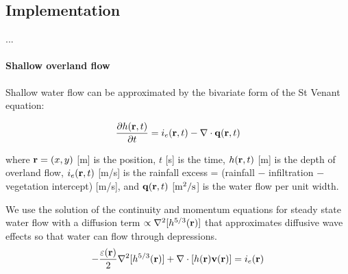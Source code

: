 \documentclass{isprs}
\begin{document}





\subsection{Implementation}
...

\paragraph{Shallow overland flow}





Shallow water flow can be approximated by
the bivariate form of the St Venant equation:

\begin{equation}
\label{eq:water}
{\partial h({\bf r},t) \over \partial t} =
 i_e({\bf r},t) - \nabla \cdot {\bf q}({\bf r},t)
\end{equation}

where 
${\bf r}=(x,y)$ [m] is the position, 
$t$ [s] is the time,
$h({\bf r},t)$ [m] is the depth of overland flow,
$i_e({\bf r},t)$ [m/s] is the rainfall excess = 
(rainfall $-$ infiltration $-$ vegetation intercept) [m/s], and
${\bf q}({\bf r},t)$ [$\rm m^2/s$] is the water flow per unit width.

We use the solution of the continuity and momentum equations for steady state water flow
with a diffusion term $ \propto \nabla^2 [h^{5/3}({\bf r})]$ 
that approximates diffusive wave effects 
so that water can flow through depressions. 
%
\begin{equation}
\label{eq:difwater}
-{\varepsilon({\bf r})\over 2 }\nabla^2 [h^{5/3}({\bf r})]
+\nabla \cdot [ h({\bf r}){\bf v}({\bf r})] = i_e({\bf r})
\end{equation}
\end{document}
